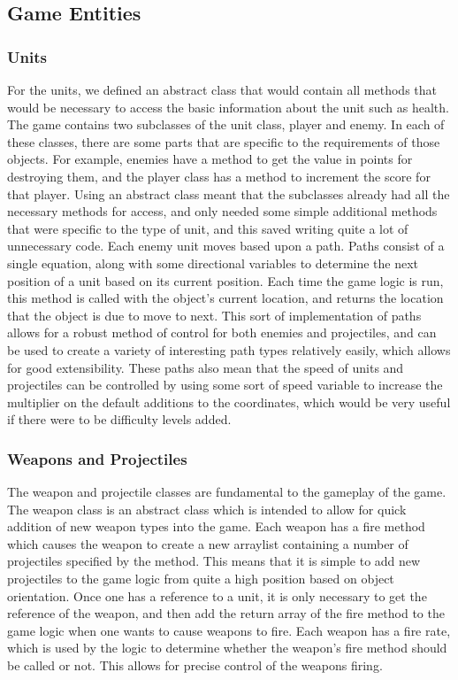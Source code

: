 \subsection{Game Entities}
\subsubsection{Units}
For the units, we defined an abstract class that would contain all methods that would be necessary to access the basic information about the unit such as health. The game contains two subclasses of the unit class, player and enemy. In each of these classes, there are some parts that are specific to the requirements of those objects. For example, enemies have a method to get the value in points for destroying them, and the player class has a method to increment the score for that player. Using an abstract class meant that the subclasses already had all the necessary methods for access, and only needed some simple additional methods that were specific to the type of unit, and this saved writing quite a lot of unnecessary code. Each enemy unit moves based upon a path. Paths consist of a single equation, along with some directional variables to determine the next position of a unit based on its current position. Each time the game logic is run, this method is called with the object's current location, and returns the location that the object is due to move to next. This sort of implementation of paths allows for a robust method of control for both enemies and projectiles, and can be used to create a variety of interesting path types relatively easily, which allows for good extensibility. These paths also mean that the speed of units and projectiles can be controlled by using some sort of speed variable to increase the multiplier on the default additions to the coordinates, which would be very useful if there were to be difficulty levels added.
\subsubsection{Weapons and Projectiles}
The weapon and projectile classes are fundamental to the gameplay of the game. The weapon class is an abstract class which is intended to allow for quick addition of new weapon types into the game. Each weapon has a fire method which causes the weapon to create a new arraylist containing a number of projectiles specified by the method. This means that it is simple to add new projectiles to the game logic from quite a high position based on object orientation. Once one has a reference to a unit, it is only necessary to get the reference of the weapon, and then add the return array of the fire method to the game logic when one wants to cause weapons to fire. Each weapon has a fire rate, which is used by the logic to determine whether the weapon's fire method should be called or not. This allows for precise control of the weapons firing.

